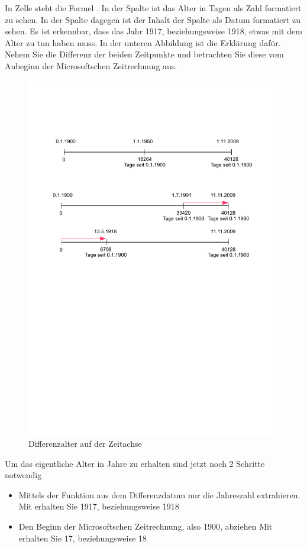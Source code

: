 In Zelle  steht die Formel . In der Spalte  ist das Alter in Tagen als Zahl formatiert zu sehen. In der Spalte  dagegen ist der Inhalt der Spalte  als Datum formatiert zu sehen. Es ist erkennbar, dass das Jahr 1917, beziehungsweise
1918, etwas mit dem Alter zu tun haben muss. In der unteren Abbildung ist die Erklärung dafür. Nehem Sie die Differenz der beiden Zeitpunkte und betrachten Sie diese vom Anbeginn der Microsoftschen Zeitrechnung aus.
	\begin{figure}[H]
		\centering
		\includegraphics{_OpenOffice/datum3.pdf}
		\caption{Differenzalter auf der Zeitachse}
		\label{fig:datum3}
	\end{figure}



Um das eigentliche Alter in Jahre zu erhalten sind jetzt noch 2 Schritte notwendig
\begin{itemize}
	\smallitemize
	\item Mittels der Funktion  aus dem Differenzdatum nur die Jahreszahl extrahieren.\\
	Mit  erhalten Sie 1917, beziehungsweise 1918
	\item Den Beginn der Microsoftschen Zeitrechnung, also 1900, abziehen
	Mit  erhalten Sie 17, beziehungsweise 18
\end{itemize}

